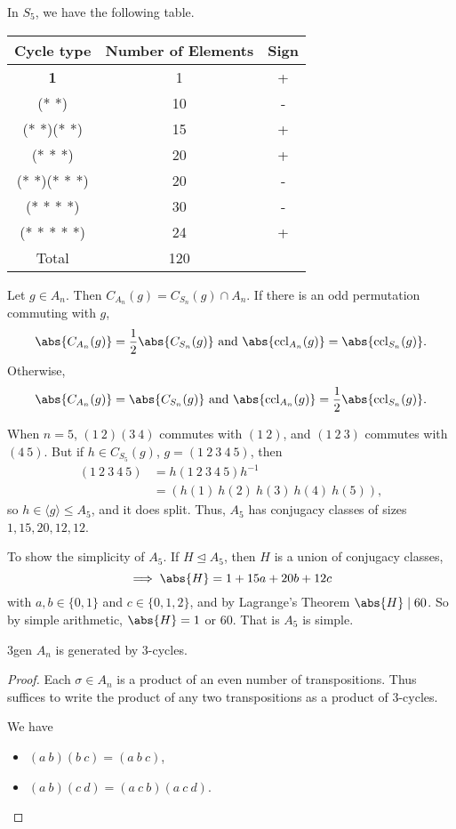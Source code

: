 \begin{example}
    In \(S_5\), we have the following table.
    \begin{center}
    \begin{tabular}{c|c|c}
        Cycle type & Number of Elements & Sign\\
        \hline
        \textbf{1}& 1 & +\\
        (* *)& 10& -\\
        (* *)(* *)& 15 & +\\
        (* * *)& 20 & +\\
        (* *)(* * *)& 20& -\\
        (* * * *)&30&-\\
        (* * * * *)&24&+\\
        \hline
        Total&120&
    \end{tabular}
\end{center}
\end{example}
Let \(g \in A_n\). Then \(C_{A_n}(g) = C_{S_n}(g)\cap A_n\). If there is an odd permutation commuting with \(g\),
\[
    \abs{C_{A_n}(g)} = \frac{1}{2}\abs{C_{S_n}(g)} \text{ and } \abs{\mathrm{ccl}_{A_n}(g)} = \abs{\mathrm{ccl}_{S_n}(g)} .
\]
Otherwise,
\[
    \abs{C_{A_n}(g)} = \abs{C_{S_n}(g)} \text{ and } \abs{\mathrm{ccl}_{A_n}(g)} = \frac{1}{2}\abs{\mathrm{ccl}_{S_n}(g)} .
\]
\begin{example}
    When \(n = 5\), \((1~2)(3~4)\) commutes with \((1~2)\), and \((1~2~3)\) commutes with \((4~5)\). But if \(h \in C_{S_5}(g)\), \(g=(1~2~3~4~5)\), then
    \begin{align*}
        (1~2~3~4~5) &= h (1~2~3~4~5) h^{-1}\\
        &=(h(1)~h(2)~h(3)~h(4)~h(5)),
    \end{align*}
    so \(h \in \langle g\rangle\leq A_5\), and it does split. Thus, \(A_5\) has conjugacy classes of sizes \(1,15,20,12,12\).
    
    To show the simplicity of \(A_5\). If \(H \trianglelefteq A_5\), then \(H\) is a union of conjugacy classes,
    \[
        \implies \abs{H} = 1 + 15a + 20b + 12c
    \]
    with \(a,b \in \{0,1\}\) and \(c \in \{0,1,2\}\), and by Lagrange's Theorem \(\abs{H} \mid 60\). So by simple arithmetic, \(\abs{H} = 1\) or \(60\). That is \(A_5\) is simple.
\end{example}
\begin{lemma}{}{3gen}
    \(A_n\) is generated by 3-cycles.
\end{lemma}
\begin{proof}
    Each \(\sigma \in A_n\) is a product of an even number of transpositions. Thus suffices to write the product of any two transpositions as a product of 3-cycles.
    
    We have
    \begin{itemize}
        \item \((a~b)(b~c) = (a~b~c)\),
        \item \((a~b)(c~d) = (a~c~b)(a~c~d)\).
    \end{itemize}
\end{proof}
